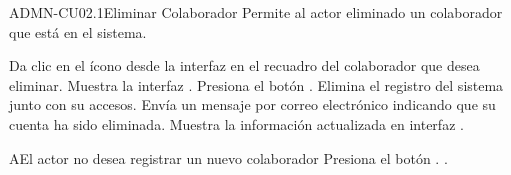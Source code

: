 \begin{UseCase}{ADMN-CU02.1}{Eliminar  Colaborador}{
	Permite al actor eliminado un colaborador que está en el sistema.
}
	  

\end{UseCase}

\begin{UCtrayectoria}
	\UCpaso [\UCactor] Da clic en el ícono \IUEliminar{} desde la interfaz  en el recuadro del colaborador que desea eliminar.
	\UCpaso [\UCsist] Muestra la interfaz .
	\UCpaso [\UCactor] Presiona el botón .
	\UCpaso Elimina el registro del sistema junto con su accesos.
	\UCpaso Envía un mensaje por correo electrónico indicando que su cuenta ha sido eliminada.
    \UCpaso [\UCsist] Muestra la información actualizada en interfaz .
	
\end{UCtrayectoria}

\begin{UCtrayectoriaA}{A}{El actor no desea registrar un nuevo colaborador}
	\UCpaso [\UCsist] Presiona el botón .
	.
\end{UCtrayectoriaA} 

